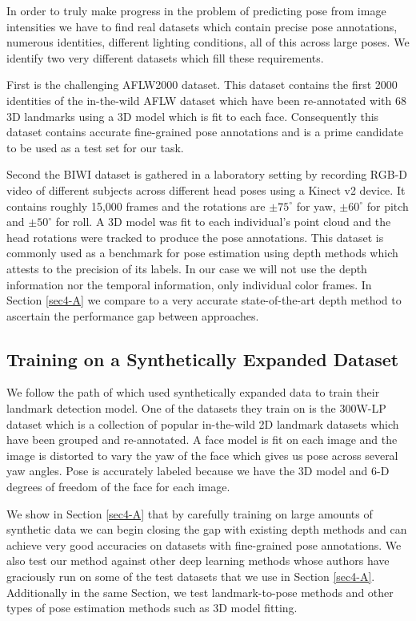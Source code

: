 \documentclass[10pt,twocolumn,letterpaper]{article}
\begin{document}
In order to truly make progress in the problem of predicting pose from image intensities we have to find real datasets which contain precise pose annotations, numerous identities, different lighting conditions, all of this across large poses. We identify two very different datasets which fill these requirements.

First is the challenging AFLW2000 dataset. This dataset contains the first 2000 identities of the in-the-wild AFLW dataset which have been re-annotated with 68 3D landmarks using a 3D model which is fit to each face. Consequently this dataset contains accurate fine-grained pose annotations and is a prime candidate to be used as a test set for our task.

Second the BIWI dataset is gathered in a laboratory setting by recording RGB-D video of different subjects across different head poses using a Kinect v2 device. It contains roughly 15,000 frames and the rotations are $\pm 75^\circ$ for yaw, $\pm 60^\circ$ for pitch and $\pm 50^\circ$ for roll. A 3D model was fit to each individual's point cloud and the head rotations were tracked to produce the pose annotations. This dataset is commonly used as a benchmark for pose estimation using depth methods which attests to the precision of its labels. In our case we will not use the depth information nor the temporal information, only individual color frames. In Section \ref{sec4-A} we compare to a very accurate state-of-the-art depth method to ascertain the performance gap between approaches.

\subsection{Training on a Synthetically Expanded Dataset}\label{sec3-D}

We follow the path of \cite{bulat2017far} which used synthetically expanded data to train their landmark detection model. One of the datasets they train on is the 300W-LP dataset which is a collection of popular in-the-wild 2D landmark datasets which have been grouped and re-annotated. A face model is fit on each image and the image is distorted to vary the yaw of the face which gives us pose across several yaw angles. Pose is accurately labeled because we have the 3D model and 6-D degrees of freedom of the face for each image. 

We show in Section \ref{sec4-A} that by carefully training on large amounts of synthetic data we can begin closing the gap with existing depth methods and can achieve very good accuracies on datasets with fine-grained pose annotations. We also test our method against other deep learning methods whose authors have graciously run on some of the test datasets that we use in Section \ref{sec4-A}. Additionally in the same Section, we test landmark-to-pose methods and other types of pose estimation methods such as 3D model fitting.
\end{document}
